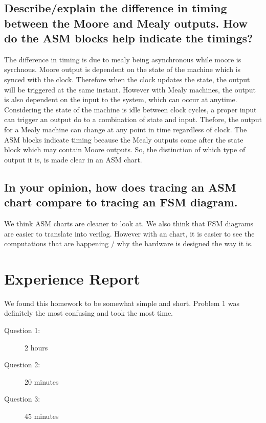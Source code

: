 \documentclass[12pt]{article}
\newenvironment{subquestion}[1]{\subsection{#1}
\begin{tcolorbox}[colback=blue!2!white,colframe=blue!20!white]}{\end{tcolorbox}}
\begin{document}
    \section{}
        \begin{subquestion}{Describe/explain the difference in timing between the Moore and Mealy outputs. How do the ASM blocks help indicate the timings?}
            The difference in timing is due to mealy being asynchronous while moore is syrchnous. Moore output is dependent on the state of the machine which is synced with the clock. Therefore when the clock updates the state, the output will be triggered at the same instant. However with Mealy machines, the output is also dependent on the input to the system, which can occur at anytime. Considering the state of the machine is idle between clock cycles, a proper input can trigger an output do to a combination of state and input. Thefore, the output for a Mealy machine can change at any point in time regardless of clock. The ASM blocks indicate timing because the Mealy outputs come after the state block which may contain Moore outputs. So, the distinction of which type of output it is, is made clear in an ASM chart. 
            
        \end{subquestion}

        \begin{subquestion}{In your opinion, how does tracing an ASM chart compare to tracing an FSM diagram.}
            We think ASM charts are cleaner to look at. We also think that FSM diagrams are easier to translate into verilog. However with an chart, it is easier to see the computations that are happening / why the hardware is designed the way it is. 
        \end{subquestion}

    \section{Experience Report}
        We found this homework to be somewhat simple and short. Problem 1 was definitely the most confusing and took the most time. 
        \begin{description}
            \item[Question 1:] 2 hours
            \item[Question 2:] 20 minutes
            \item[Question 3:] 45 minutes
        \end{description}        
\end{document}

